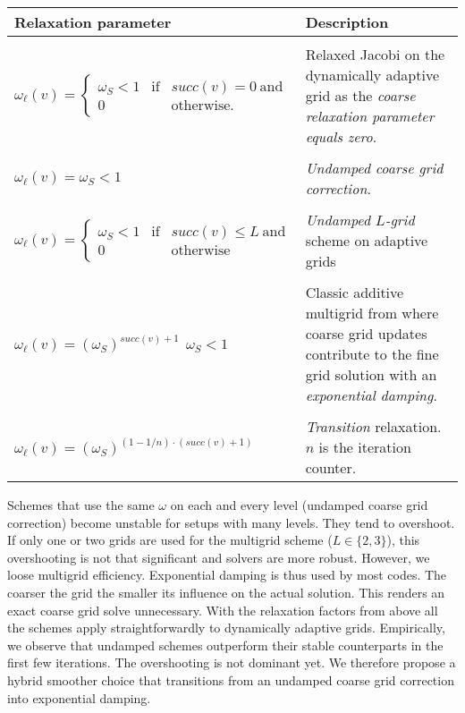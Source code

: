 \begin{center}
 \begin{tabular}{l|p{7cm}}
   Relaxation parameter & Description \\
   \hline
   \\[-0.2cm]
   $\omega_\ell(v)=\left\{  
   \begin{array}{lcl}
     \omega_{S}<1 & \mbox{if} & succ(v)=0 \ \mbox{and} \\
     0           && \mbox{otherwise.}
   \end{array}
   \right.$
   & Relaxed Jacobi on the dynamically adaptive
   grid as the {\it coarse relaxation parameter equals zero}. 
   \\ 
   \hline
   \\[-0.2cm]
   $\omega_\ell(v)= \omega_{S} < 1$
   & 
   {\it Undamped coarse grid correction}.
   \\
   \hline
   \\[-0.2cm]
  $\omega_\ell (v)=\left\{  
    \begin{array}{lcl}
      \omega_{S}<1 & \mbox{if} & succ(v)\leq L  \  \mbox{and} \\
      0           && \mbox{otherwise}
    \end{array}
  \right.$ 
  &
  {\it Undamped $L$-grid} scheme on adaptive grids
  \\
   \hline
   \\[-0.2cm]
  $\omega_\ell (v)= \left( \omega_{S} \right)^{succ(v)+1}\ \ \omega_S<1$
  &
  Classic additive multigrid from \cite{Bastian:98:AdditiveVsMultiplicativeMG} where
  coarse grid updates contribute to the fine grid solution with an {\em
  exponential damping}.
  \\
   \hline
   \\[-0.2cm]
  $\omega_\ell (v)= \left( \omega_{S} \right) ^{ (1-1/n) \cdot
  (succ(v)+1)}$
  &
  {\em Transition} relaxation. $n$ is the iteration counter.
  \\
  \hline
 \end{tabular}
\end{center}




\noindent
Schemes that use the same $\omega$ on each and every level (undamped coarse grid
correction) become unstable \cite{Bastian:98:AdditiveVsMultiplicativeMG} for
setups with many levels.
They tend to overshoot.
If only one or two grids are used for the multigrid scheme ($L\in\{2,3\}$), this
overshooting is not that significant and solvers are more robust.
However, we loose multigrid efficiency.
Exponential damping is thus used by most codes.
The coarser the grid the smaller its influence on the actual solution.
This renders an exact coarse grid solve unnecessary.
With the relaxation factors from above all the schemes apply straightforwardly
to dynamically adaptive grids.
Empirically, we observe that undamped schemes outperform their stable
counterparts in the first few iterations. 
The overshooting is not dominant yet. 
We therefore propose a hybrid smoother choice that transitions from an undamped
coarse grid correction into exponential damping. 
  


